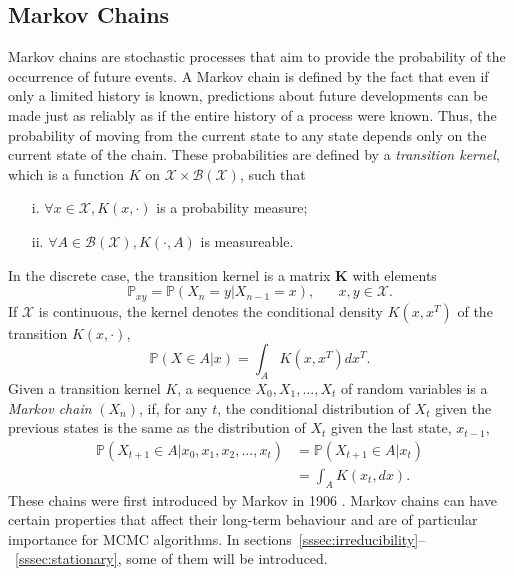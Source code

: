 \subsection{Markov Chains}
Markov chains are stochastic processes that aim to provide the probability of the occurrence of future events. A Markov chain is defined by the fact that even if only a limited history is known, predictions about future developments can be made just as reliably as if the entire history of a process were known. Thus, the probability of moving from the current state to any state depends only on the current state of the chain. These probabilities are defined by a \textit{transition kernel}, which is a function $K$ on $\mathcal{X} \times \mathcal{B}\left(\mathcal{X}\right)$, such that
\begin{itemize}
    \item[i.] $\forall x\in\mathcal{X}, K\left(x, \cdot\right)$ is a probability measure;
    \item[ii.] $\forall A\in \mathcal{B}\left(\mathcal{X}\right), K\left(\cdot, A\right)$ is measureable.
\end{itemize}
In the discrete case, the transition kernel is a matrix $\pmb{K}$ with elements
\begin{equation*}
    \mathbb{P}_{xy}=\mathbb{P}\left(X_n=y|X_{n-1}=x\right), \hspace{20pt}x,y\in\mathcal{X}.
\end{equation*}
If $\mathcal{X}$ is continuous, the kernel denotes the conditional density $K\left(x,x^T\right)$ of the transition $K\left(x,\cdot\right)$,
\begin{equation*}
    \mathbb{P}\left(X\in A|x\right)=\int_AK\left(x,x^T\right)dx^T.
\end{equation*}
Given a transition kernel $K$, a sequence $X_0,X_1,...,X_t$ of random variables is a \textit{Markov chain} $\left(X_n\right)$, if, for any $t$, the conditional distribution of $X_t$ given the previous states is the same as the distribution of $X_t$ given the last state, $x_{t-1}$,
\begin{align}
    \mathbb{P}\left(X_{t+1}\in A|x_0,x_1,x_2,...,x_t\right) &= \mathbb{P}\left(X_{t+1}\in A|x_t\right) \nonumber\\
    &= \int_A K\left(x_t, dx\right). 
\end{align}
These chains were first introduced by Markov in 1906 \autocite[][]{markov1906extension}. Markov chains can have certain properties that affect their long-term behaviour and are of particular importance for MCMC algorithms. In sections~\ref{sssec:irreducibility}--~\ref{sssec:stationary}, some of them will be introduced.
